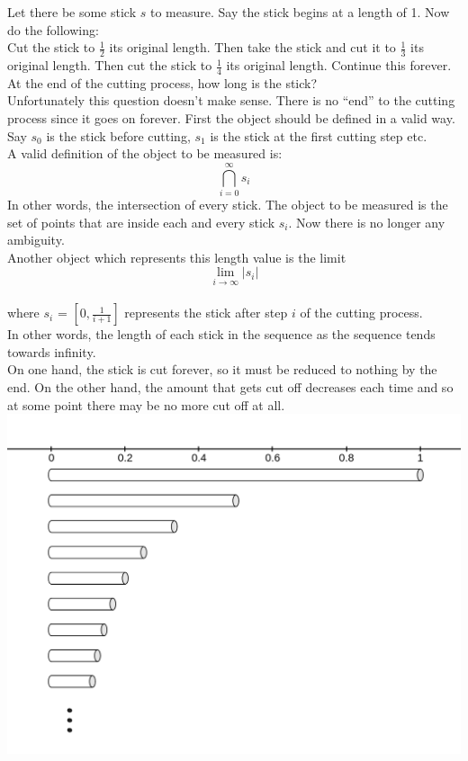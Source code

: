 \documentclass[11pt]{ekblite}
\begin{document}
\begin{example}
	Let there be some stick $s$ to measure. Say the stick begins at a length of 1. Now do the following:
	\\[0.2in]Cut the stick to $\frac{1}{2}$ its original length. Then take the stick and cut it to $\frac{1}{3}$ its original length. Then cut the stick to $\frac{1}{4}$ its original length. Continue this forever.
	\\[0.2in]At the end of the cutting process, how long is the stick?
	\\[0.2in]Unfortunately this question doesn't make sense. There is no ``end'' to the cutting process since it goes on forever. First the object should be defined in a valid way. Say $s_0$ is the stick before cutting, $s_1$ is the stick at the first cutting step etc.
	\\[0.2in]A valid definition of the object to be measured is:
	\[\bigcap_{i=0}^{\infty} s_i\]
	In other words, the intersection of every stick. The object to be measured is the set of points that are inside each and every stick $s_i$. Now there is no longer any ambiguity.
	\\[0.2in]Another object which represents this length value is the limit
	\[\lim_{i \rightarrow \infty} |s_i|\]
	\\where $s_i$ = $[0,\frac{1}{i+1}]$ represents the stick after step $i$ of the cutting process.	
	\\[0.2in]In other words, the length of each stick in the sequence as the sequence tends towards infinity.
	\\[0.2in]On one hand, the stick is cut forever, so it must be reduced to nothing by the end. On the other hand, the amount that gets cut off decreases each time and so at some point there may be no more cut off at all.
	\\\includegraphics[scale=0.33]{img/c5.jpg}

\end{example}
\end{document}
